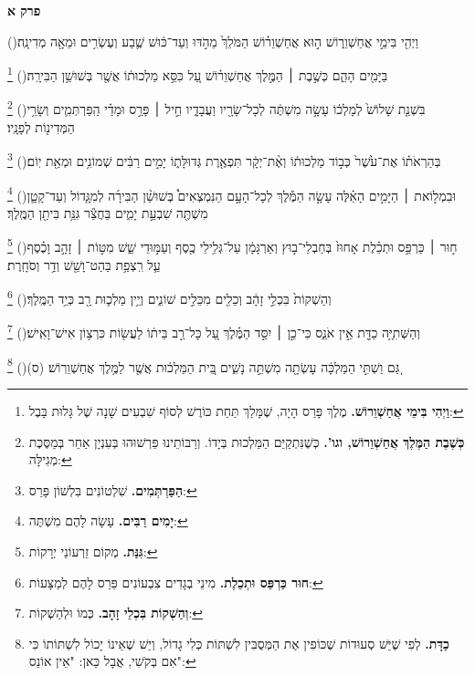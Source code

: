\documentclass[12pt, openany]{book}
\renewcommand{\partname}[1]{}
\newcommand{\sethebfont}{
\fontsize{10.5pt}{13.1pt} \selectfont
}
\newcommand{\setengfont}{
\fontsize{14pt}{17.5pt} \selectfont
}
\newcommand{\chapname}{}
\newcommand{\newchap}[1]{
	\addcontentsline{toc}{chapter}{#1}
	\renewcommand{\chapname}{#1}
		\begin{center}
			\textbf{%
\fontsize{16pt}{16pt}\selectfont
				#1}
		\end{center}
}
\newcommand{\footnotecomment}[1]{
	\renewcommand\thefootnote{}
	\footnote{\textsf{#1}}}
\newcommand{\commenta}[1]{\footnotecomment{#1}\hspace{0em}}
\newcommand{\vsnum}[1]{(\hebrewnumeral{#1})\space}
\begin{document}
\renewcommand{\partname}[1]{אסתר}
\fancyhead[CO]{\chapname}
\fancyhead[CE]{\partname}
\renewcommand{\sethebfont}{\fontsize{14pt}{21.0pt} \selectfont}\sethebfont
\renewcommand{\setengfont}{\fontsize{14pt}{21.0pt} \selectfont}\setengfont
\newchap{פרק א}
\begin{multicols}{2}
\vsnum{1}וַיְהִ֖י בִּימֵ֣י אֲחַשְׁוֵר֑וֹשׁ ה֣וּא אֲחַשְׁוֵר֗וֹשׁ הַמֹּלֵךְ֙ מֵהֹ֣דּוּ וְעַד־כּ֔וּשׁ שֶׁ֛בַע וְעֶשְׂרִ֥ים וּמֵאָ֖ה מְדִינָֽה׃%
\commenta{\textrm{\textbf{וַיְהִי בִּימֵי אֲחַשְׁוֵרוֹשׁ.}} מֶלֶךְ פָּרַס הָיָה, שֶׁמָּלַךְ תַּחַת כּוֹרֶשׁ לְסוֹף שִׁבְעִים שָׁנָה שֶׁל גָּלוּת בָּבֶל: }%
\vsnum{2}בַּיָּמִ֖ים הָהֵ֑ם כְּשֶׁ֣בֶת ׀ הַמֶּ֣לֶךְ אֲחַשְׁוֵר֗וֹשׁ עַ֚ל כִּסֵּ֣א מַלְכוּת֔וֹ אֲשֶׁ֖ר בְּשׁוּשַׁ֥ן הַבִּירָֽה׃%
\commenta{\textrm{\textbf{כְּשֶׁבֶת הַמֶּלֶךְ אֲחַשְׁוֵרוֹשׁ, וגו'.}} כְּשֶׁנִּתְקַיֵּם הַמַּלְכוּת בְּיָדוֹ. וְרַבּוֹתֵינוּ פֵּרְשׁוּהוּ בְּעִנְיָן אַחֵר בְּמַסֶּכֶת מְגִילָּה:}%
\vsnum{3}בִּשְׁנַ֤ת שָׁלוֹשׁ֙ לְמָלְכ֔וֹ עָשָׂ֣ה מִשְׁתֶּ֔ה לְכָל־שָׂרָ֖יו וַעֲבָדָ֑יו חֵ֣יל ׀ פָּרַ֣ס וּמָדַ֗י הַֽפַּרְתְּמִ֛ים וְשָׂרֵ֥י הַמְּדִינ֖וֹת לְפָנָֽיו׃%
\commenta{\textrm{\textbf{הַפַּרְתְּמִים.}} שִׁלְטוֹנִים בִּלְשׁוֹן פָּרַס:}%
\vsnum{4}בְּהַרְאֹת֗וֹ אֶת־עֹ֙שֶׁר֙ כְּב֣וֹד מַלְכוּת֔וֹ וְאֶ֨ת־יְקָ֔ר תִּפְאֶ֖רֶת גְּדוּלָּת֑וֹ יָמִ֣ים רַבִּ֔ים שְׁמוֹנִ֥ים וּמְאַ֖ת יֽוֹם׃%
\commenta{\textrm{\textbf{יָמִים רַבִּים.}} עָשָׂה לָהֶם מִשְׁתֶּה:}%
\vsnum{5}וּבִמְל֣וֹאת ׀ הַיָּמִ֣ים הָאֵ֗לֶּה עָשָׂ֣ה הַמֶּ֡לֶךְ לְכָל־הָעָ֣ם הַנִּמְצְאִים֩ בְּשׁוּשַׁ֨ן הַבִּירָ֜ה לְמִגָּ֧דוֹל וְעַד־קָטָ֛ן מִשְׁתֶּ֖ה שִׁבְעַ֣ת יָמִ֑ים בַּחֲצַ֕ר גִּנַּ֥ת בִּיתַ֖ן הַמֶּֽלֶךְ׃%
\commenta{\textrm{\textbf{גִּנַּת.}} מְקוֹם זֵרְעוֹנֵי יְרָקוֹת:}%
\vsnum{6}ח֣וּר ׀ כַּרְפַּ֣ס וּתְכֵ֗לֶת אָחוּז֙ בְּחַבְלֵי־ב֣וּץ וְאַרְגָּמָ֔ן עַל־גְּלִ֥ילֵי כֶ֖סֶף וְעַמּ֣וּדֵי שֵׁ֑שׁ מִטּ֣וֹת ׀ זָהָ֣ב וָכֶ֗סֶף עַ֛ל רִֽצְפַ֥ת בַּהַט־וָשֵׁ֖שׁ וְדַ֥ר וְסֹחָֽרֶת׃%
\commenta{\textrm{\textbf{חוּר כַּרְפַּס וּתְכֵלֶת.}} מִינֵי בְגָדִים צִבְעוֹנִים פֵּרַס לָהֶם לְמַצָּעוֹת:}%
\vsnum{7}וְהַשְׁקוֹת֙ בִּכְלֵ֣י זָהָ֔ב וְכֵלִ֖ים מִכֵּלִ֣ים שׁוֹנִ֑ים וְיֵ֥ין מַלְכ֛וּת רָ֖ב כְּיַ֥ד הַמֶּֽלֶךְ׃%
\commenta{\textrm{\textbf{וְהַשְׁקוֹת בִּכְלֵי זָהָב.}} כְּמוֹ וּלְהַשְׁקוֹת:}%
\vsnum{8}וְהַשְּׁתִיָּ֥ה כַדָּ֖ת אֵ֣ין אֹנֵ֑ס כִּי־כֵ֣ן ׀ יִסַּ֣ד הַמֶּ֗לֶךְ עַ֚ל כָּל־רַ֣ב בֵּית֔וֹ לַעֲשׂ֖וֹת כִּרְצ֥וֹן אִישׁ־וָאִֽישׁ׃%
\commenta{\textrm{\textbf{כַדָּת.}} לְפִי שֶׁיֵּשׁ סְעוּדוֹת שֶׁכּוֹפִין אֶת הַמְּסֻבִּין לִשְׁתּוֹת כְּלִי גָדוֹל, וְיֵשׁ שֶׁאֵינוֹ יָכוֹל לִשְׁתּוֹתוֹ כִּי אִם בְּקֹשִׁי, אֲבָל כַּאן: "אֵין אוֹנֵס": }%
\vsnum{9}גַּ֚ם וַשְׁתִּ֣י הַמַּלְכָּ֔ה עָשְׂתָ֖ה מִשְׁתֵּ֣ה נָשִׁ֑ים בֵּ֚ית הַמַּלְכ֔וּת אֲשֶׁ֖ר לַמֶּ֥לֶךְ אֲחַשְׁוֵרֽוֹשׁ׃ (ס)

\end{multicols}
\end{document}
